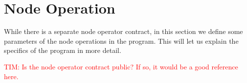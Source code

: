 
\section{Node Operation} \label{sec:node}
While there is a separate node operator contract, in this section we define some parameters of the node operations in the program.  This will let us explain the specifics of the program in more detail.

\textcolor{red}{TIM:  Is the node operator contract public?  If so, it would be a good reference here.}


